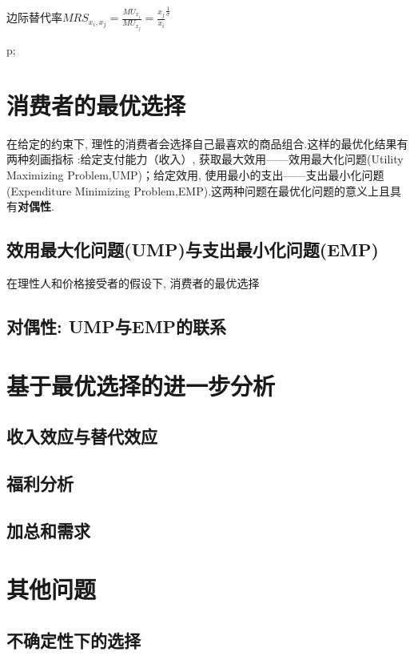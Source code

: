 \documentclass[lang=cn,10pt]{elegantbook}
\begin{document}
边际替代率$MRS_{x_i,x_j}=\frac{MU_{x_i}}{MU_{x_j}}=\frac{x_j}{x_i}^{\frac{1}{\sigma}}$

p;
\newpage
\section{消费者的最优选择}
在给定的约束下, 理性的消费者会选择自己最喜欢的商品组合.这样的最优化结果有两种刻画指标 :给定支付能力（收入）, 获取最大效用——效用最大化问题(Utility Maximizing Problem,UMP)；给定效用, 使用最小的支出——支出最小化问题(Expenditure Minimizing Problem,EMP).这两种问题在最优化问题的意义上且具有\textbf{对偶性}.

\subsection{效用最大化问题(UMP)与支出最小化问题(EMP)}
在理性人和价格接受者的假设下, 消费者的最优选择
\newpage

\subsection{对偶性: UMP与EMP的联系}
\newpage

\section{基于最优选择的进一步分析}
\newpage

\subsection{收入效应与替代效应}
\newpage

\subsection{福利分析}
\newpage

\subsection{加总和需求}
\newpage

\section{其他问题}
\newpage

\subsection{不确定性下的选择}
\newpage
\end{document}
